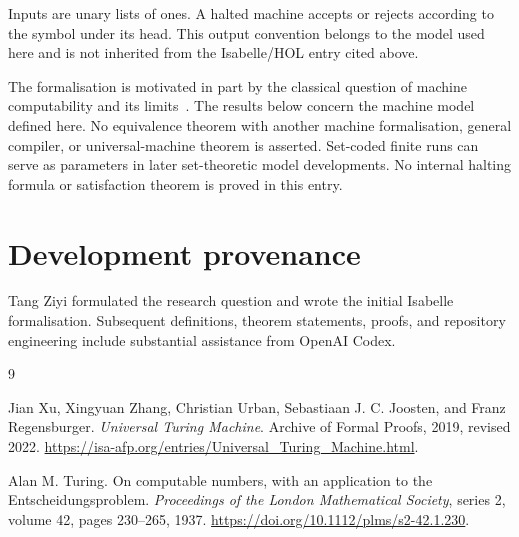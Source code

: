 \documentclass[11pt,a4paper]{article}
\begin{document}
Inputs are unary lists of ones. A halted machine accepts or rejects according
to the symbol under its head. This output convention belongs to the model
used here and is not inherited from the Isabelle/HOL entry cited above.

The formalisation is motivated in part by the classical question of machine
computability and its limits~\cite{turing1937}. The results below concern the
machine model defined here. No equivalence theorem with another machine
formalisation, general compiler, or universal-machine theorem is asserted.
Set-coded finite runs can serve as parameters in later set-theoretic model
developments. No internal halting formula or satisfaction theorem is proved
in this entry.



\section*{Development provenance}
Tang Ziyi formulated the research question and wrote the initial Isabelle
formalisation. Subsequent definitions, theorem statements, proofs, and
repository engineering include substantial assistance from OpenAI Codex.

\begin{thebibliography}{9}

Jian Xu, Xingyuan Zhang, Christian Urban, Sebastiaan J. C. Joosten, and
Franz Regensburger.
\emph{Universal Turing Machine}.
Archive of Formal Proofs, 2019, revised 2022.
\url{https://isa-afp.org/entries/Universal_Turing_Machine.html}.

Alan M. Turing.
On computable numbers, with an application to the Entscheidungsproblem.
\emph{Proceedings of the London Mathematical Society}, series 2, volume 42,
pages 230--265, 1937.
\url{https://doi.org/10.1112/plms/s2-42.1.230}.

\end{thebibliography}
\end{document}

